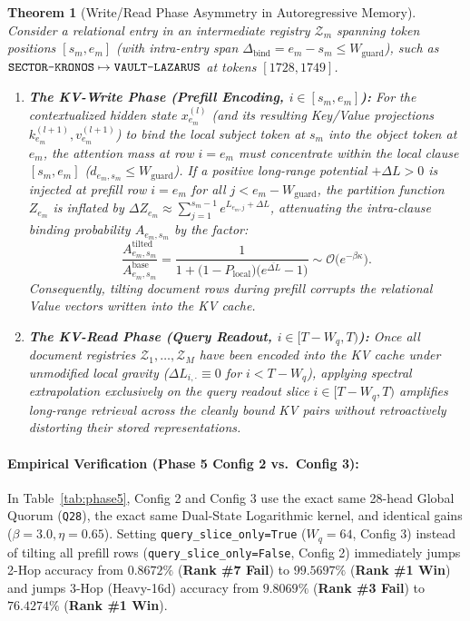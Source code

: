 \documentclass[11pt,letterpaper]{article}
\newtheorem{theorem}{Theorem}[section]
\theoremstyle{definition}
\begin{document}
\begin{theorem}[Write/Read Phase Asymmetry in Autoregressive Memory]
\label{thm:write_read}
Consider a relational entry in an intermediate registry $\mathcal{Z}_m$ spanning token positions $[s_m, e_m]$ (with intra-entry span $\Delta_{\text{bind}} = e_m - s_m \le W_{\text{guard}}$), such as $\text{\texttt{SECTOR-KRONOS}} \mapsto \text{\texttt{VAULT-LAZARUS}}$ at tokens $[1728, 1749]$.
\begin{enumerate}
    \item \textbf{The KV-Write Phase (Prefill Encoding, $i \in [s_m, e_m]$):} For the contextualized hidden state $x_{e_m}^{(l)}$ (and its resulting Key/Value projections $k_{e_m}^{(l+1)}, v_{e_m}^{(l+1)}$) to bind the local subject token at $s_m$ into the object token at $e_m$, the attention mass at row $i = e_m$ must concentrate within the local clause $[s_m, e_m]$ ($d_{e_m, s_m} \le W_{\text{guard}}$). If a positive long-range potential $+\Delta L > 0$ is injected at prefill row $i = e_m$ for all $j < e_m - W_{\text{guard}}$, the partition function $Z_{e_m}$ is inflated by $\Delta Z_{e_m} \approx \sum_{j=1}^{s_m - 1} e^{L_{e_m, j} + \Delta L}$, attenuating the intra-clause binding probability $A_{e_m, s_m}$ by the factor:
    \begin{equation}
        \frac{A^{\text{tilted}}_{e_m, s_m}}{A^{\text{base}}_{e_m, s_m}} = \frac{1}{1 + \big(1 - P_{\text{local}}\big)\big(e^{\overline{\Delta L}} - 1\big)} \sim \mathcal{O}\!\big(e^{-\beta \kappa}\big).
    \end{equation}
    Consequently, tilting document rows during prefill corrupts the relational Value vectors written into the KV cache.
    \item \textbf{The KV-Read Phase (Query Readout, $i \in [T - W_q, T)$):} Once all document registries $\mathcal{Z}_1, \dots, \mathcal{Z}_M$ have been encoded into the KV cache under unmodified local gravity ($\Delta L_{i, \cdot} \equiv 0$ for $i < T - W_q$), applying spectral extrapolation exclusively on the query readout slice $i \in [T - W_q, T)$ amplifies long-range retrieval across the cleanly bound KV pairs without retroactively distorting their stored representations.
\end{enumerate}
\end{theorem}

\paragraph{Empirical Verification (Phase 5 Config 2 vs.\ Config 3):}
In Table~\ref{tab:phase5}, Config 2 and Config 3 use the exact same 28-head Global Quorum (\texttt{Q28}), the exact same Dual-State Logarithmic kernel, and identical gains ($\beta = 3.0, \eta = 0.65$). Setting \texttt{query\_slice\_only=True} ($W_q = 64$, Config 3) instead of tilting all prefill rows (\texttt{query\_slice\_only=False}, Config 2) immediately jumps 2-Hop accuracy from $\mathbf{0.8672\%}$ (\textbf{Rank \#7 Fail}) to $\mathbf{99.5697\%}$ (\textbf{Rank \#1 Win}) and jumps 3-Hop (Heavy-16d) accuracy from $\mathbf{9.8069\%}$ (\textbf{Rank \#3 Fail}) to $\mathbf{76.4274\%}$ (\textbf{Rank \#1 Win}).
\end{document}
